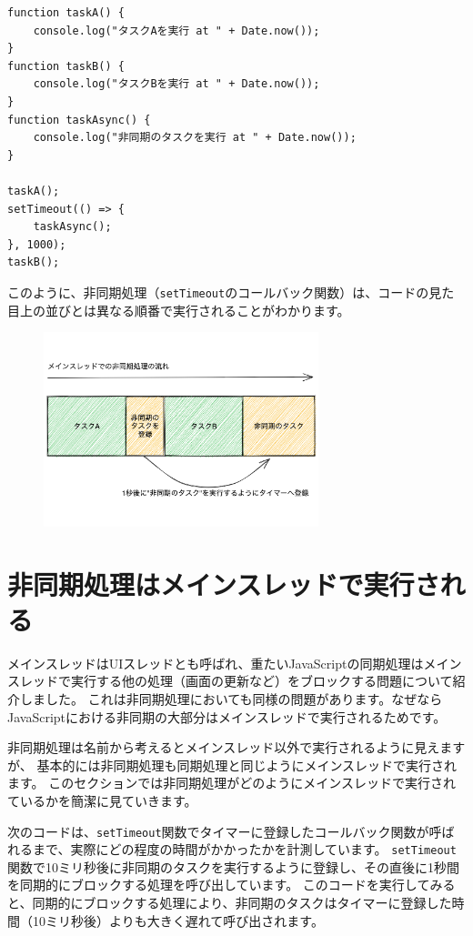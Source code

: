 \begin{lstlisting}
function taskA() {
    console.log("タスクAを実行 at " + Date.now());
}
function taskB() {
    console.log("タスクBを実行 at " + Date.now());
}
function taskAsync() {
    console.log("非同期のタスクを実行 at " + Date.now());
}

taskA();
setTimeout(() => {
    taskAsync();
}, 1000);
taskB();
\end{lstlisting}

このように、非同期処理（\texttt{setTimeout}のコールバック関数）は、コードの見た目上の並びとは異なる順番で実行されることがわかります。

\begin{figure}[h]
\centering
\includegraphics[width=80mm]{fig/async-single-thread-tasks.pdf}
\end{figure}

\hypertarget{async-and-main-thread}{%
\section{非同期処理はメインスレッドで実行される}\label{async-and-main-thread}}

メインスレッドはUIスレッドとも呼ばれ、重たいJavaScriptの同期処理はメインスレッドで実行する他の処理（画面の更新など）をブロックする問題について紹介しました。
これは非同期処理においても同様の問題があります。なぜならJavaScriptにおける非同期の大部分はメインスレッドで実行されるためです。

非同期処理は名前から考えるとメインスレッド以外で実行されるように見えますが、
基本的には非同期処理も同期処理と同じようにメインスレッドで実行されます。
このセクションでは非同期処理がどのようにメインスレッドで実行されているかを簡潔に見ていきます。

次のコードは、\texttt{setTimeout}関数でタイマーに登録したコールバック関数が呼ばれるまで、実際にどの程度の時間がかかったかを計測しています。
\texttt{setTimeout}関数で10ミリ秒後に非同期のタスクを実行するように登録し、その直後に1秒間を同期的にブロックする処理を呼び出しています。
このコードを実行してみると、同期的にブロックする処理により、非同期のタスクはタイマーに登録した時間（10ミリ秒後）よりも大きく遅れて呼び出されます。

